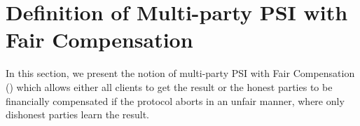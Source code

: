 

\vs
\vs
\section{Definition of Multi-party PSI with Fair Compensation}\label{sec::F-PSI-model}%





In this section, we present the notion of multi-party PSI with Fair Compensation  (\p) which allows either all clients to get the result or the honest parties to be financially compensated if the protocol aborts in an unfair manner, where only dishonest parties learn the result.  




 
 
 
 
 
 
